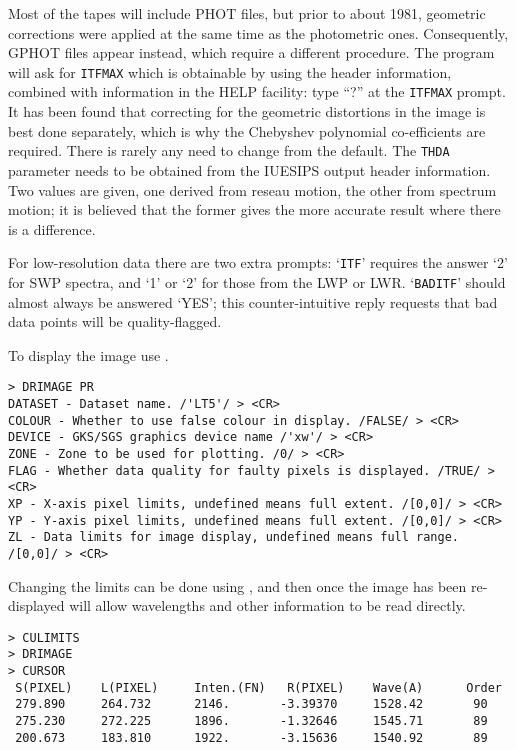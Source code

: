 Most of the tapes will include PHOT files, but prior to about 1981, geometric
corrections were applied at the same time as the photometric ones.
Consequently, GPHOT files appear instead, which require a different procedure.
The program will ask for {\tt ITFMAX} which is obtainable by using the
header information, combined with information in the HELP facility: type
``?'' at the {\tt ITFMAX} prompt. It has been found that correcting for
the geometric distortions in the image is best done separately, which
is why the Chebyshev polynomial co-efficients are required. There is rarely
any need to change from the default. The {\tt THDA} parameter needs to be
obtained from the IUESIPS output header information. Two values are given,
one derived from reseau motion, the other from spectrum motion; it is
believed that the former gives the more accurate result where there is a
difference.

For low-resolution data there are two extra prompts: `{\tt ITF}' requires
the answer `2' for SWP spectra, and `1' or `2' for those from the LWP or LWR.
`{\tt BADITF}' should almost always be answered `YES'; this counter-intuitive
reply requests that bad data points will be quality-flagged.

To display the image use \@.

\begin{verbatim}
> DRIMAGE PR
DATASET - Dataset name. /'LT5'/ > <CR>
COLOUR - Whether to use false colour in display. /FALSE/ > <CR>
DEVICE - GKS/SGS graphics device name /'xw'/ > <CR>
ZONE - Zone to be used for plotting. /0/ > <CR>
FLAG - Whether data quality for faulty pixels is displayed. /TRUE/ > <CR>
XP - X-axis pixel limits, undefined means full extent. /[0,0]/ > <CR>
YP - Y-axis pixel limits, undefined means full extent. /[0,0]/ > <CR>
ZL - Data limits for image display, undefined means full range. /[0,0]/ > <CR>
\end{verbatim}

Changing the limits can be done using ,
and then once the image has been re-displayed 
will allow wavelengths and other information to be read directly.

\begin{verbatim}
> CULIMITS
> DRIMAGE
> CURSOR
 S(PIXEL)    L(PIXEL)     Inten.(FN)   R(PIXEL)    Wave(A)      Order
 279.890     264.732      2146.       -3.39370     1528.42       90
 275.230     272.225      1896.       -1.32646     1545.71       89
 200.673     183.810      1922.       -3.15636     1540.92       89
\end{verbatim}

